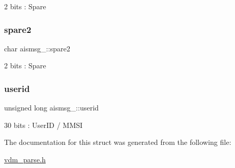 2 bits \+: Spare 

\mbox{\label{structaismsg__10_af4f70bcf92fc82e9676326292691dbd7}} 
\subsubsection{\texorpdfstring{spare2}{spare2}}
{\footnotesize\ttfamily char aismsg\+\_\+::spare2}



2 bits \+: Spare 

\mbox{\label{structaismsg__10_aa62b226245d329c6707afc9872fc96ba}} 
\subsubsection{\texorpdfstring{userid}{userid}}
{\footnotesize\ttfamily unsigned long aismsg\+\_\+::userid}



30 bits \+: User\+ID / M\+M\+SI 



The documentation for this struct was generated from the following file\+:\begin{DoxyCompactItemize}
\item 
\mbox{\hyperlink{vdm__parse_8h}{vdm\+\_\+parse.\+h}}\end{DoxyCompactItemize}

